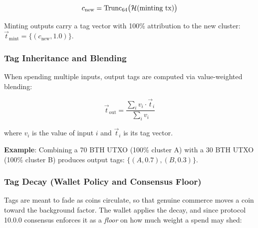 \begin{equation}
c_{\text{new}} = \text{Trunc}_{64}\bigl(\mathcal{H}(\text{minting tx})\bigr)
\end{equation}

Minting outputs carry a tag vector with 100\% attribution to the new cluster:
$\vec{t}_{\text{mint}} = \{(c_{\text{new}}, 1.0)\}$.

\subsubsection{Tag Inheritance and Blending}

When spending multiple inputs, output tags are computed via value-weighted
blending:

\begin{equation}
\vec{t}_{\text{out}} = \frac{\sum_i v_i \cdot \vec{t}_i}{\sum_i v_i}
\end{equation}

where $v_i$ is the value of input $i$ and $\vec{t}_i$ is its tag vector.

\textbf{Example}: Combining a 70 BTH UTXO (100\% cluster A) with a 30 BTH
UTXO (100\% cluster B) produces output tags: $\{(A, 0.7), (B, 0.3)\}$.

\subsubsection{Tag Decay (Wallet Policy and Consensus Floor)}
\label{sec:tag-decay}

Tags are meant to fade as coins circulate, so that genuine commerce moves a
coin toward the background factor. The wallet applies the decay, and since
protocol 10.0.0 consensus enforces it as a \emph{floor} on how much weight a
spend may shed:

